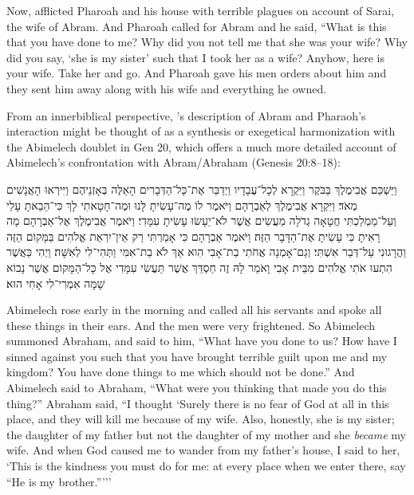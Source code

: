 \begin{translation}
    Now, \yahweh afflicted Pharoah and his house with terrible plagues on account of Sarai, the wife of Abram. 
    And Pharoah called for Abram and he said, ``What is this that you have done to me? Why did you not tell me that she was your wife? 
    Why did you say, `she is my sister' such that I took her as a wife? Anyhow, here is your wife. Take her and go. 
    And Pharoah gave his men orders about him and they sent him away along with his wife and everything he owned.
\end{translation}

From an innerbiblical perspective, \ga's description of Abram and Pharaoh's interaction might be thought of as a synthesis or exegetical harmonization with the Abimelech doublet in Gen 20, which offers a much more detailed account of Abimelech's confrontation with Abram/Abraham (Genesis 20:8--18):

\begin{hebrewtext}
    וַיַּשְׁכֵּם אֲבִימֶלֶךְ בַּבֹּקֶר וַיִּקְרָא לְכָל־עֲבָדָיו וַיְדַבֵּר אֶת־כָּל־הַדְּבָרִים הָאֵלֶּה בְּאָזְנֵיהֶם וַיִּירְאוּ הָאֲנָשִׁים מְאֹד׃
    וַיִּקְרָא אֲבִימֶלֶךְ לְאַבְרָהָם וַיֹּאמֶר לוֹ מֶה־עָשִׂיתָ לָּנוּ וּמֶה־חָטָאתִי לָךְ כִּי־הֵבֵאתָ עָלַי וְעַל־מַמְלַכְתִּי חֲטָאָה גְדֹלָה מַעֲשִׂים אֲשֶׁר לֹא־יֵעָשׂוּ עָשִׂיתָ עִמָּדִי׃
    וַיֹּאמֶר אֲבִימֶלֶךְ אֶל־אַבְרָהָם מָה רָאִיתָ כִּי עָשִׂיתָ אֶת־הַדָּבָר הַזֶּה׃
    וַיֹּאמֶר אַבְרָהָם כִּי אָמַרְתִּי רַק אֵין־יִרְאַת אֱלֹהִים בַּמָּקוֹם הַזֶּה וַהֲרָגוּנִי עַל־דְּבַר אִשְׁתִּי׃
    וְגַם־אָמְנָה אֲחֹתִי בַת־אָבִי הִוא אַךְ לֹא בַת־אִמִּי וַתְּהִי־לִי לְאִשָּׁה׃
    וַיְהִי כַּאֲשֶׁר הִתְעוּ אֹתִי אֱלֹהִים מִבֵּית אָבִי וָאֹמַר לָהּ זֶה חַסְדֵּךְ אֲשֶׁר תַּעֲשִׂי עִמָּדִי אֶל כָּל־הַמָּקוֹם אֲשֶׁר נָבוֹא שָׁמָּה אִמְרִי־לִי אָחִי הוּא׃
\end{hebrewtext}

\begin{translation}
    Abimelech rose early in the morning and called all his servants and spoke all these things in their ears. And the men were very frightened. 
    So Abimelech summoned Abraham, and said to him, ``What have you done to us? How have I sinned against you such that you have brought terrible guilt upon me and my kingdom? You have done things to me which should not be done.''
    And Abimelech said to Abraham, “What were you thinking that made you do this thing?” 
    Abraham said, ``I thought `Surely there is no fear of God at all in this place, and they will kill me because of my wife. 
    Also, honestly, she is my sister; the daughter of my father but not the daughter of my mother and she \emph{became} my wife.
    And when God caused me to wander from my father's house, I said to her, `This is the kindness you must do for me: at every place when we enter there, say  ``He is my brother.'''''
\end{translation}

